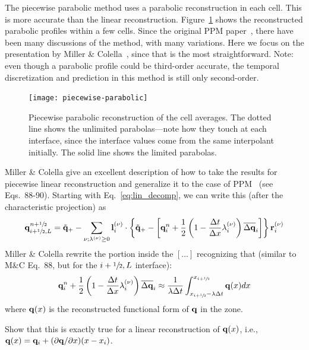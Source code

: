 The piecewise parabolic method uses a parabolic reconstruction in each
cell.  This is more accurate than the linear reconstruction.
Figure~\ref{fig:ppm} shows the reconstructed parabolic profiles within
a few cells.  Since the original PPM
paper~\cite{colellawoodward:1984}, there have been many discussions of
the method, with many variations.  Here we focus on the presentation
by Miller \& Colella~\cite{millercolella:2002}, since that is the most
straightforward.  Note: even though a parabolic profile could be
third-order accurate, the temporal discretization and prediction in
this method is still only second-order.
%
\begin{figure}[t]
\centering
\texttt{[image: piecewise-parabolic]}
\caption[Piecewise parabolic reconstruction of the cell
  averages]{\label{fig:ppm} Piecewise parabolic reconstruction of the
  cell averages.  The dotted line shows the unlimited parabolas---note
  how they touch at each interface, since the interface values come
  from the same interpolant initially.  The solid line shows the
  limited parabolas.}
\end{figure}


Miller \& Colella give an excellent description of how to take the
results for piecewise linear reconstruction and generalize it to the case of
PPM~\cite{colellawoodward:1984} (see Eqs.\ 88-90).  Starting with
Eq.~\ref{eq:lin_decomp}, we can write this (after the characteristic
projection) as
\begin{equation}
{\bf q}_{i+{\sfrac{1}{2}},L}^{n+{\sfrac{1}{2}}} = \tilde{{\bf q}}_+ -
   \sum_{\nu;\lambda^{(\nu)}\ge 0} {\bf l}_i^{(\nu)} \cdot \left \{
        \tilde{{\bf q}}_+ - \left [ {\bf q}_i^n +
            \frac{1}{2} \left ( 1 - \frac{\Delta t}{\Delta x} \lambda_i^{(\nu)} \right ) \overline{\Delta {\bf q}}_i \right ]
       \right \} {\bf r}_i^{(\nu)}
\end{equation}
Miller \& Colella rewrite the portion inside the $[\ldots]$
recognizing that (similar to M\&C Eq.\ 88, but for the $i+{\sfrac{1}{2}},L$ interface):
\begin{equation}
  {\bf q}_i^n + \frac{1}{2} \left (1 - \frac{\Delta t}{\Delta x} \lambda_i^{(\nu)} \right ) \overline{\Delta {\bf q}}_i
  \approx \frac{1}{\lambda \Delta t} \int_{x_{i+{\sfrac{1}{2}}} - \lambda \Delta t}^{x_{i+{\sfrac{1}{2}}}}
           {\bf q}(x) dx
\end{equation}
where ${\bf q}(x)$ is the reconstructed functional form of ${\bf q}$ in the zone.

\begin{exercise}
{Show that this is exactly true for a linear reconstruction of ${\bf q}(x)$, i.e.,
${\bf q}(x) = {\bf q}_i + (\partial {\bf q}/\partial x) (x - x_i)$.}
\end{exercise}

